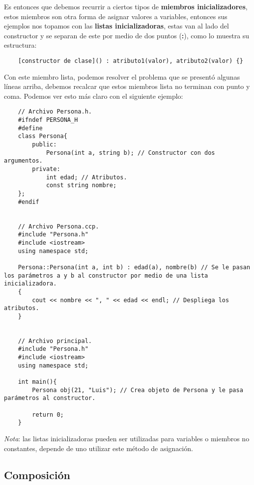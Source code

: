 Es entonces que debemos recurrir a ciertos tipos de \textbf{miembros inicializadores}, estos miembros son otra forma de asignar valores a variables, entonces sus ejemplos nos topamos con las \textbf{listas inicializadoras}, estas van al lado del constructor y se separan de este por medio de dos puntos (\textbf{:}), como lo muestra su estructura:
\begin{lstlisting}
    [constructor de clase]() : atributo1(valor), atributo2(valor) {}
\end{lstlisting}

Con este miembro lista, podemos resolver el problema que se presentó algunas líneas arriba, debemos recalcar que estos miembros lista no terminan con punto y coma. Podemos ver esto más claro con el siguiente ejemplo:
\begin{lstlisting}
    // Archivo Persona.h.
    #ifndef PERSONA_H
    #define
    class Persona{
        public:
            Persona(int a, string b); // Constructor con dos argumentos.
        private:
            int edad; // Atributos.
            const string nombre;
    };
    #endif

    
    // Archivo Persona.ccp.
    #include "Persona.h"
    #include <iostream>
    using namespace std;
    
    Persona::Persona(int a, int b) : edad(a), nombre(b) // Se le pasan los parámetros a y b al constructor por medio de una lista inicializadora.
    {
        cout << nombre << ", " << edad << endl; // Despliega los atributos.
    }

    
    // Archivo principal.
    #include "Persona.h"
    #include <iostream>
    using namespace std;
    
    int main(){
        Persona obj(21, "Luis"); // Crea objeto de Persona y le pasa parámetros al constructor.
    
        return 0;
    }
\end{lstlisting}

\textit{Nota}: las listas inicializadoras pueden ser utilizadas para variables o miembros no constantes, depende de uno utilizar este método de asignación.


\subsection{Composición}

